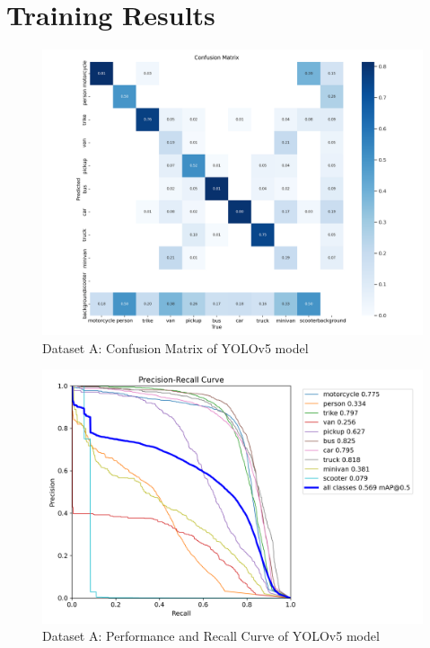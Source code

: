 \documentclass[conference]{IEEEtran}
\begin{document}
\section{Training Results}
		\begin{figure}[h]
			\centering
			\includegraphics[width=\columnwidth]{Figures/dataset_a/a_confusion_matrix.png}
			\caption{Dataset A: Confusion Matrix of YOLOv5 model}
			\label{fig:ukDatasetYolov5LargeWeight}
		\end{figure}
		
		\begin{figure}[h]
			\centering
			\includegraphics[width=\columnwidth]{Figures/dataset_a/PR_curve.png}
			\caption{Dataset A: Performance and Recall Curve of YOLOv5 model}
			\label{fig:ukDatasetYolov5LargeWeightPRCurve}
		\end{figure}
\end{document}
